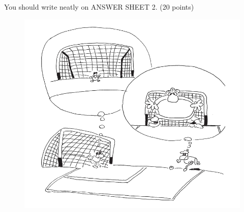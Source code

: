 You should write neatly on ANSWER SHEET 2. (20 points)

\begin{figure}[h!]
	\centering
	\includegraphics[width=0.56\linewidth]{picture/2007.png}
\end{figure}

\checkpagenumber